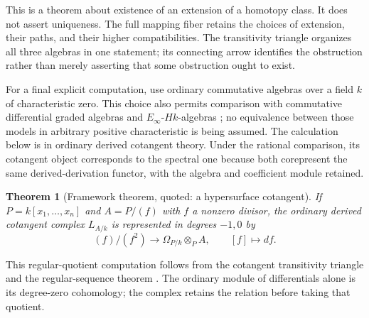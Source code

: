 \documentclass[11pt]{article}
\newtheorem{theorem}{Theorem}[section]
\theoremstyle{definition}
\theoremstyle{remark}\newtheorem{remark}[theorem]{Remark}
\begin{document}
This is a theorem about existence of an extension of a homotopy class.
It does not assert uniqueness.  The full mapping fiber retains the
choices of extension, their paths, and their higher compatibilities.
The transitivity triangle organizes all three algebras in one statement;
its connecting arrow identifies the obstruction rather than merely
asserting that some obstruction ought to exist.

For a final explicit computation, use ordinary commutative algebras over
a field $k$ of characteristic zero.  This choice also permits comparison
with commutative differential graded algebras and $E_\infty$-$Hk$-algebras
\cite[Proposition 7.1.4.11]{HA}; no equivalence between those models in
arbitrary positive characteristic is being assumed. The calculation below
is in ordinary derived cotangent theory. Under the rational comparison,
its cotangent object corresponds to the spectral one because both
corepresent the same derived-derivation functor, with the algebra and
coefficient module retained.

\begin{theorem}[Framework theorem, quoted: a hypersurface cotangent]
\label{t:hypersurface-input}
If $P=k[x_1,\ldots,x_n]$ and $A=P/(f)$ with $f$ a nonzero divisor,
the ordinary derived cotangent complex $L_{A/k}$ is represented in
degrees $-1,0$ by
\[
 (f)/(f^2)\longrightarrow\Omega_{P/k}\otimes_P A,
 \qquad [f]\longmapsto df.
\]
\end{theorem}
This regular-quotient computation follows from the cotangent
transitivity triangle and the regular-sequence theorem
\cite[Tags 08SH, 08QX]{Stacks}.  The ordinary module of differentials
alone is its degree-zero cohomology; the complex retains the relation
before taking that quotient.
\end{document}
